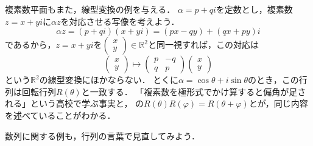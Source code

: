 \begin{mycolumn}
  複素数平面もまた，線型変換の例を与える．
  $\alpha = p + qi$を定数とし，複素数$z = x + yi$に$\alpha z$を対応させる写像を考えよう．
  \[
    \alpha z = (p + qi)(x + yi) = (px - qy) + (qx + py)i
  \]
  であるから，$z = x + yi$を$\begin{pmatrix} x \\ y \end{pmatrix} \in \mathbb{R}^2$と同一視すれば，この対応は
  \[
    \begin{pmatrix} x \\ y \end{pmatrix} \longmapsto
    \begin{pmatrix} p & -q \\ q & p \end{pmatrix}
    \begin{pmatrix} x \\ y \end{pmatrix}
  \]
  という$\mathbb{R}^2$の線型変換にほかならない．
  とくに$\alpha = \cos\theta + i\sin\theta$のとき，この行列は回転行列$R(\theta)$と一致する．
  「複素数を極形式でかけ算すると偏角が足される」という高校で学ぶ事実と，
  の$R(\theta)R(\varphi) = R(\theta + \varphi)$とが，同じ内容を述べていることがわかる．
\end{mycolumn}

数列に関する例も，行列の言葉で見直してみよう．

